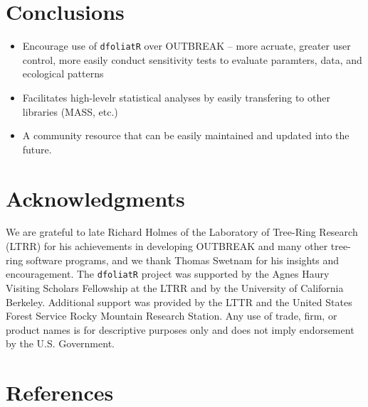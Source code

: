 \documentclass[review]{elsarticle} %
\providecommand{\tightlist}{%
  \setlength{\itemsep}{0pt}\setlength{\parskip}{0pt}}
\newenvironment{Shaded}{\begin{snugshade}}{\end{snugshade}}
\newcommand{\CommentTok}[1]{\textcolor[rgb]{0.56,0.35,0.01}{\textit{#1}}}
\newcommand{\KeywordTok}[1]{\textcolor[rgb]{0.13,0.29,0.53}{\textbf{#1}}}
\newcommand{\NormalTok}[1]{#1}
\newcommand{\OperatorTok}[1]{\textcolor[rgb]{0.81,0.36,0.00}{\textbf{#1}}}
\newcommand{\StringTok}[1]{\textcolor[rgb]{0.31,0.60,0.02}{#1}}
\begin{document}
\begin{Shaded}
\end{Shaded}

\hypertarget{conclusions}{%
\section{Conclusions}\label{conclusions}}

\begin{itemize}
\tightlist
\item
  Encourage use of \texttt{dfoliatR} over OUTBREAK -- more acruate, greater user control, more easily conduct sensitivity tests to evaluate paramters, data, and ecological patterns
\item
  Facilitates high-levelr statistical analyses by easily transfering to other libraries (MASS, etc.)
\item
  A community resource that can be easily maintained and updated into the future.
\end{itemize}

\hypertarget{acknowledgments}{%
\section*{Acknowledgments}\label{acknowledgments}}

We are grateful to late Richard Holmes of the Laboratory of Tree-Ring Research (LTRR) for his achievements in developing OUTBREAK and many other tree-ring software programs, and we thank Thomas Swetnam for his insights and encouragement. The \texttt{dfoliatR} project was supported by the Agnes Haury Visiting Scholars Fellowship at the LTRR and by the University of California Berkeley. Additional support was provided by the LTTR and the United States Forest Service Rocky Mountain Research Station. Any use of trade, firm, or product names is for descriptive purposes only and does not imply endorsement by the U.S. Government.

\hypertarget{references}{%
\section*{References}\label{references}}
\end{document}
